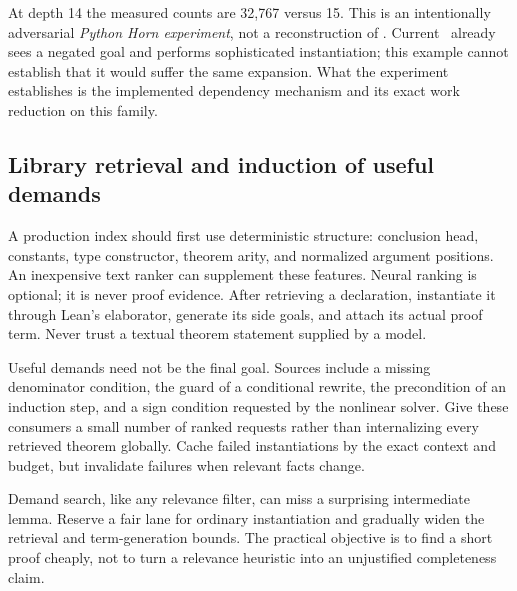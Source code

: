 At depth 14 the measured counts are 32,767 versus 15. This is an intentionally
adversarial \emph{Python Horn experiment}, not a reconstruction of \grind.
Current \grind\ already sees a negated goal and performs sophisticated
instantiation; this example cannot establish that it would suffer the same
expansion. What the experiment establishes is the implemented dependency
mechanism and its exact work reduction on this family.

\subsection{Library retrieval and induction of useful demands}

A production index should first use deterministic structure: conclusion head,
constants, type constructor, theorem arity, and normalized argument positions.
An inexpensive text ranker can supplement these features. Neural ranking is
optional; it is never proof evidence. After retrieving a declaration, instantiate
it through Lean's elaborator, generate its side goals, and attach its actual
proof term. Never trust a textual theorem statement supplied by a model.

Useful demands need not be the final goal. Sources include a missing denominator
condition, the guard of a conditional rewrite, the precondition of an induction
step, and a sign condition requested by the nonlinear solver. Give these
consumers a small number of ranked requests rather than internalizing every
retrieved theorem globally. Cache failed instantiations by the exact context
and budget, but invalidate failures when relevant facts change.

Demand search, like any relevance filter, can miss a surprising intermediate
lemma. Reserve a fair lane for ordinary instantiation and gradually widen the
retrieval and term-generation bounds. The practical objective is to find a
short proof cheaply, not to turn a relevance heuristic into an unjustified
completeness claim.
